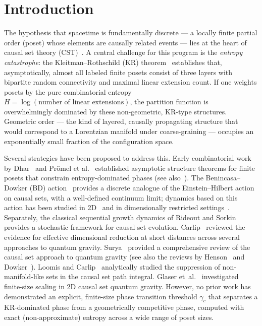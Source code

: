 \documentclass[entropy,article,submit,pdftex,moreauthors]{Definitions/mdpi}
\begin{document}
\section{Introduction}

The hypothesis that spacetime is fundamentally discrete --- a locally finite partial order (poset) whose elements are causally related events --- lies at the heart of causal set theory (CST)~\cite{bombelli1987,sorkin2005}. A central challenge for this program is the \emph{entropy catastrophe}: the Kleitman--Rothschild (KR) theorem~\cite{kleitman1975} establishes that, asymptotically, almost all labeled finite posets consist of three layers with bipartite random connectivity and maximal linear extension count. If one weights posets by the pure combinatorial entropy $H = \log(\text{number of linear extensions})$, the partition function is overwhelmingly dominated by these non-geometric, KR-type structures. Geometric order --- the kind of layered, causally propagating structure that would correspond to a Lorentzian manifold under coarse-graining --- occupies an exponentially small fraction of the configuration space.

Several strategies have been proposed to address this. Early combinatorial work by Dhar~\cite{dhar1978} and Pr\"omel et al.~\cite{promel2001} established asymptotic structure theorems for finite posets that constrain entropy-dominated phases (see also~\cite{kleitman1975}). The Benincasa--Dowker (BD) action~\cite{benincasa2010,benincasa2011} provides a discrete analogue of the Einstein--Hilbert action on causal sets, with a well-defined continuum limit; dynamics based on this action has been studied in 2D~\cite{surya2012} and in dimensionally restricted settings~\cite{cunningham2020}. Separately, the classical sequential growth dynamics of Rideout and Sorkin~\cite{rideout2000} provides a stochastic framework for causal set evolution. Carlip~\cite{carlip2017} reviewed the evidence for effective dimensional reduction at short distances across several approaches to quantum gravity. Surya~\cite{surya2019} provided a comprehensive review of the causal set approach to quantum gravity (see also the reviews by Henson~\cite{henson2006} and Dowker~\cite{dowker2005}). Loomis and Carlip~\cite{loomis2018} analytically studied the suppression of non-manifold-like sets in the causal set path integral. Glaser et~al.~\cite{glaser2018} investigated finite-size scaling in 2D causal set quantum gravity. However, no prior work has demonstrated an explicit, finite-size phase transition threshold $\gamma_c$ that separates a KR-dominated phase from a geometrically competitive phase, computed with exact (non-approximate) entropy across a wide range of poset sizes.
\end{document}
